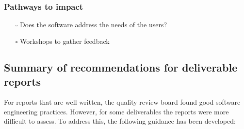 \subsubsection{Pathways to impact}
\label{sec:orgc218a3a}
\begin{itemize}
\item[{$\square$}] Does the software address the needs of the users?
\item[{$\square$}] Workshops to gather feedback
\end{itemize}

\subsection{Summary of recommendations for deliverable reports}
\label{sec:summ-recomm-deliv}
For reports that are well written, the quality review board found good
software engineering practices. However, for some deliverables the
reports were more difficult to assess. To address this, the following
guidance has been developed:

